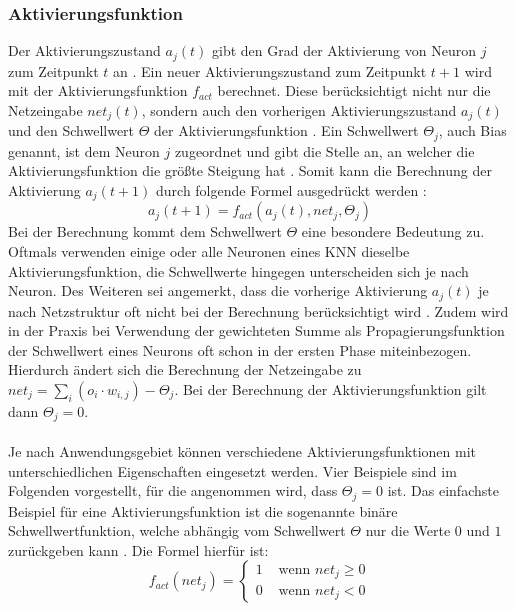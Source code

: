 \subsubsection{Aktivierungsfunktion}
\label{subsubsec:activatoin_function}
Der Aktivierungszustand $a_j(t)$ gibt den Grad der Aktivierung von Neuron $j$ zum Zeitpunkt $t$ an \cite{zell2003simulation}. Ein neuer Aktivierungszustand zum Zeitpunkt $t+1$ wird mit der Aktivierungsfunktion $f_{act}$ berechnet. Diese berücksichtigt nicht nur die Netzeingabe $net_j(t)$, sondern auch den vorherigen Aktivierungszustand $a_j(t)$ und den Schwellwert $\Theta$ der Aktivierungsfunktion \cite{zell2003simulation}. Ein Schwellwert $\Theta_j$, auch Bias genannt, ist dem Neuron $j$ zugeordnet und gibt die Stelle an, an welcher die Aktivierungsfunktion die größte Steigung hat \cite{kriesel2008kleiner}. Somit kann die Berechnung der Aktivierung $a_j(t+1)$ durch folgende Formel ausgedrückt werden \cite{zell2003simulation}:
$$a_j(t+1)=f_{act}(a_j(t), net_j, \Theta_j)$$ %
Bei der Berechnung kommt dem Schwellwert $\Theta$ eine besondere Bedeutung zu. Oftmals verwenden einige oder alle Neuronen eines \ac{KNN} dieselbe Aktivierungsfunktion, die Schwellwerte hingegen unterscheiden sich je nach Neuron. Des Weiteren sei angemerkt, dass  die vorherige Aktivierung $a_j(t)$ je nach Netzstruktur oft nicht bei der Berechnung berücksichtigt wird \cite{kriesel2008kleiner}. Zudem wird in der Praxis bei Verwendung der gewichteten Summe als Propagierungsfunktion der Schwellwert eines Neurons oft schon in der ersten Phase miteinbezogen. Hierdurch ändert sich die Berechnung der Netzeingabe zu $net_j=\sum_{i}(o_{i} \cdot w_{i, j}) - \Theta_j$. Bei der Berechnung der Aktivierungsfunktion gilt dann $\Theta_j = 0$.
\\\\
Je nach Anwendungsgebiet können verschiedene Aktivierungsfunktionen mit unterschiedlichen Eigenschaften eingesetzt werden. Vier Beispiele sind im Folgenden vorgestellt, für die angenommen wird, dass $\Theta_j=0$ ist. Das einfachste Beispiel für eine Aktivierungsfunktion ist die sogenannte binäre Schwellwertfunktion, welche abhängig vom Schwellwert $\Theta$ nur die Werte $0$ und $1$ zurückgeben kann \cite{kriesel2008kleiner}. Die Formel hierfür ist: 
$$
f_{act}(net_j)=\left\{\begin{array}{ll}
1 & \text { wenn } net_j \geq 0 \\
0 & \text { wenn } net_j < 0
\end{array}\right.
$$
